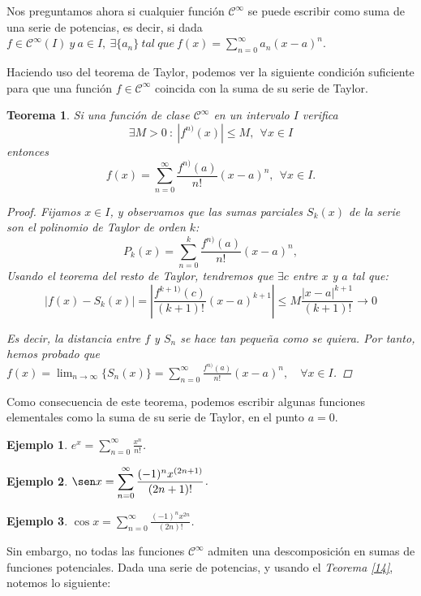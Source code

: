 \documentclass[11pt, a4paper]{article}
\theoremstyle{theorem-style}
\newtheorem{nth}{Teorema}[section]
\theoremstyle{definition-style}
\theoremstyle{remark-style}
\theoremstyle{example-style}
\newtheorem{ejemplo}{Ejemplo}[section]
\begin{document}
Nos preguntamos ahora si cualquier función $\mathcal{C}^{\infty}$ se puede escribir como suma de una serie de potencias, es decir, si dada $f \in \mathcal{C}^{\infty}(I)\ y\ a \in I, \ \exists \{a_n\}\ tal\ que\ f(x) = \sum_{n=0}^{\infty}a_n(x-a)^n$.


Haciendo uso del teorema de Taylor, podemos ver la siguiente condici\'on suficiente para que una funci\'on $f\in \mathcal{C}^\infty$ coincida con la suma de su serie de Taylor.

\begin{nth} \label{15}
  Si una funci\'on de clase $\mathcal{C}^\infty$ en un intervalo $I$ verifica 
  \[
    \exists M>0 \ : \  |f^{n)}(x)|\leq M, \ \ \forall x\in I
  \]
  entonces 
  \[
    f(x) = \sum_{n=0}^\infty \frac{f^{n)} (a)}{n!} (x-a)^n , \ \ \forall x\in I.
  \]

  \begin{proof}
    Fijamos $x \in I$, y observamos que las sumas parciales $S_k(x)$ de la serie son el polinomio de Taylor de orden $k$: 
    \[
      P_k(x) =  \sum_{n=0}^k \frac{f^{n)} (a)}{n!} (x-a)^n,
    \]
    Usando el teorema del resto de Taylor, tendremos que $\exists c$ entre $x$ y $a$ tal que:
    \[
      |f(x)-S_k(x)| =\left| \frac{ f^{k+1)} (c)}{(k+1)!} (x-a)^{k+1}\right| \leq  M \frac{|x-a|^{k+1}}{(k+1)!} \to 0
    \]

    Es decir, la distancia entre $f$ y $S_n$ se hace tan pequeña como se quiera. Por tanto, hemos probado que $\displaystyle f(x) = \lim_{n \to \infty} \{S_n(x)\} = \sum_{n=0}^{\infty} \frac{f^{n)} (a)}{n!} (x-a)^n, \quad \forall x \in I$.
  \end{proof}
\end{nth}
Como consecuencia de este teorema, podemos escribir algunas funciones elementales como la suma de su serie de Taylor, en el punto $a = 0$.

\begin{ejemplo}
  $e^x = \displaystyle \sum_{n=0}^\infty  \frac{x^n}{n!}$. 
\end{ejemplo}

\begin{ejemplo}
  $\sen x = \displaystyle \sum_{n=0}^\infty   \frac{(-1)^n x^{(2n+1)}}{(2n+1)!}$.
\end{ejemplo}
\begin{ejemplo}
  $\cos x = \displaystyle \sum_{n=0}^\infty   \frac{(-1)^n x^{2n}}{(2n)!}$.
\end{ejemplo}


Sin embargo, no todas las funciones $\mathcal{C}^{\infty}$ admiten una descomposición en sumas de funciones potenciales. Dada una serie de potencias, y usando el \textit{Teorema \ref{14}}, notemos lo siguiente:
\end{document}
